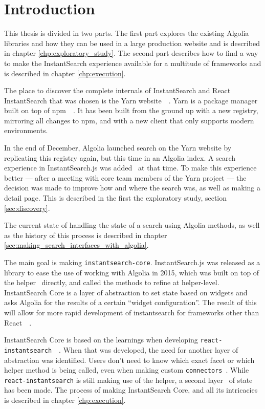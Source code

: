 
\chapter{Introduction} %
\label{chp:introduction}

This thesis is divided in two parts. The first part explores the existing Algolia libraries and how they can be used in a large production website and is described in chapter \ref{chp:exploratory_study}. The second part describes how to find a way to make the InstantSearch experience available for a multitude of frameworks and is described in chapter \ref{chp:execution}.

The place to discover the complete internals of InstantSearch and React InstantSearch that was chosen is the Yarn website~\cite{yarn-site}~. Yarn is a package manager built on top of npm~\cite{npm-github}~. It has been built from the ground up with a new registry, mirroring all changes to npm, and with a new client that only supports modern environments.

In the end of December, Algolia launched search on the Yarn website by replicating this registry again, but this time in an Algolia index. A search experience in InstantSearch.js was added~\cite{yarn-pr-add-algolia} at that time. To make this experience better --- after a meeting with core team members of the Yarn project --- the decision was made to improve how and where the search was, as well as making a detail page. This is described in the first the exploratory study, section \ref{sec:discovery}.

The current state of handling the state of a search using Algolia methods, as well as the history of this process is described in chapter \ref{sec:making_search_interfaces_with_algolia}. %

The main goal is making {\tt instantsearch-core}. InstantSearch.js was released as a \gls{library} to ease the use of working with Algolia in 2015, which was built on top of the helper~\cite{algolia-js-helper} directly, and called the methods to refine at helper-level. InstantSearch Core is a layer of abstraction to set state based on widgets and asks Algolia for the results of a certain ``widget configuration''. The result of this will allow for more rapid development of instantsearch for frameworks other than React~\cite{react-doc}~.

InstantSearch Core is based on the learnings when developing {\tt react-instantsearch}~\cite{react-instantsearch}~.  When that was developed, the need for another layer of abstraction was identified. Users don't need to know which exact facet or which helper method is being called, even when making custom {\tt connectors}\cite{react-instantsearch-connectors}~. While {\tt react-instantsearch} is still making use of the helper, a second layer~\cite{react-instantsearch-search-state} of state has been made. The process of making InstantSearch Core, and all its intricacies is described in chapter \ref{chp:execution}.
